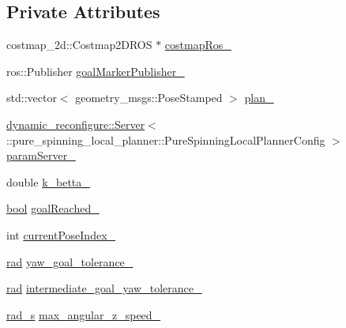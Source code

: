 \subsection*{Private Attributes}
\begin{DoxyCompactItemize}
\item 
costmap\+\_\+2d\+::\+Costmap2\+D\+R\+OS $\ast$ \hyperlink{classcl__move__base__z_1_1pure__spinning__local__planner_1_1PureSpinningLocalPlanner_a63f75481071df118d56e8b652e68b002}{costmap\+Ros\+\_\+}
\item 
ros\+::\+Publisher \hyperlink{classcl__move__base__z_1_1pure__spinning__local__planner_1_1PureSpinningLocalPlanner_a84d46237a0a26822fe5675f0cdddc94d}{goal\+Marker\+Publisher\+\_\+}
\item 
std\+::vector$<$ geometry\+\_\+msgs\+::\+Pose\+Stamped $>$ \hyperlink{classcl__move__base__z_1_1pure__spinning__local__planner_1_1PureSpinningLocalPlanner_a31875ee78bae4698b579e20c0754860d}{plan\+\_\+}
\item 
\hyperlink{strikes__back_2servers_2led__action__server_2src_2led__action__server__node_8cpp_a2036ae39d23f8e14a2cc8ddcd46dea5a}{dynamic\+\_\+reconfigure\+::\+Server}$<$\+::pure\+\_\+spinning\+\_\+local\+\_\+planner\+::\+Pure\+Spinning\+Local\+Planner\+Config $>$ \hyperlink{classcl__move__base__z_1_1pure__spinning__local__planner_1_1PureSpinningLocalPlanner_a5e91943cf4500d35199004a09cc09ca4}{param\+Server\+\_\+}
\item 
double \hyperlink{classcl__move__base__z_1_1pure__spinning__local__planner_1_1PureSpinningLocalPlanner_a379d2ba057231d76edd1a661d3572d68}{k\+\_\+betta\+\_\+}
\item 
\hyperlink{classbool}{bool} \hyperlink{classcl__move__base__z_1_1pure__spinning__local__planner_1_1PureSpinningLocalPlanner_aecfe0dfc68b8c8e461e8b684e5fa4d2f}{goal\+Reached\+\_\+}
\item 
int \hyperlink{classcl__move__base__z_1_1pure__spinning__local__planner_1_1PureSpinningLocalPlanner_aa0f9b4cf52a76e44dc2cfc5103d52dcd}{current\+Pose\+Index\+\_\+}
\item 
\hyperlink{backward__local__planner_8h_a640effbe91ae9b25d698a883a9e80d96}{rad} \hyperlink{classcl__move__base__z_1_1pure__spinning__local__planner_1_1PureSpinningLocalPlanner_a07334cd7bf29f391c2553f0038fa94e8}{yaw\+\_\+goal\+\_\+tolerance\+\_\+}
\item 
\hyperlink{backward__local__planner_8h_a640effbe91ae9b25d698a883a9e80d96}{rad} \hyperlink{classcl__move__base__z_1_1pure__spinning__local__planner_1_1PureSpinningLocalPlanner_a2e8dfda5e9dea6f09db4056aa90b2aa8}{intermediate\+\_\+goal\+\_\+yaw\+\_\+tolerance\+\_\+}
\item 
\hyperlink{pure__spinning__local__planner_8h_a76bf9d2bc75b779e3418b2320c652037}{rad\+\_\+s} \hyperlink{classcl__move__base__z_1_1pure__spinning__local__planner_1_1PureSpinningLocalPlanner_a20edb2db356925684de4ee4fe03d5992}{max\+\_\+angular\+\_\+z\+\_\+speed\+\_\+}
\end{DoxyCompactItemize}



